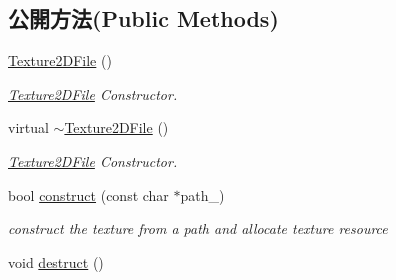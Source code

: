 \subsection*{公開方法(Public Methods)}
\begin{DoxyCompactItemize}
\item 
\hyperlink{class_i_dream_sky_1_1_texture2_d_file_ad7997bc2c58393ffbb0f5e817e3c0d9c}{Texture2\+D\+File} ()
\begin{DoxyCompactList}\small\item\em \hyperlink{class_i_dream_sky_1_1_texture2_d_file}{Texture2\+D\+File} Constructor. \end{DoxyCompactList}\item 
virtual \hyperlink{class_i_dream_sky_1_1_texture2_d_file_a8146587656686cd41b23a3ee036239d6}{$\sim$\+Texture2\+D\+File} ()
\begin{DoxyCompactList}\small\item\em \hyperlink{class_i_dream_sky_1_1_texture2_d_file}{Texture2\+D\+File} Constructor. \end{DoxyCompactList}\item 
bool \hyperlink{class_i_dream_sky_1_1_texture2_d_file_a8799d191824e368b8bf6a1eeec3ea578}{construct} (const char $\ast$path\+\_\+)
\begin{DoxyCompactList}\small\item\em construct the texture from a path and allocate texture resource \end{DoxyCompactList}\item 
void \hyperlink{class_i_dream_sky_1_1_texture2_d_file_af4b329a7880543fb2802e44e7f1ba933}{destruct} ()\hypertarget{class_i_dream_sky_1_1_texture2_d_file_af4b329a7880543fb2802e44e7f1ba933}{}\label{class_i_dream_sky_1_1_texture2_d_file_af4b329a7880543fb2802e44e7f1ba933}


\end{DoxyCompactItemize}
